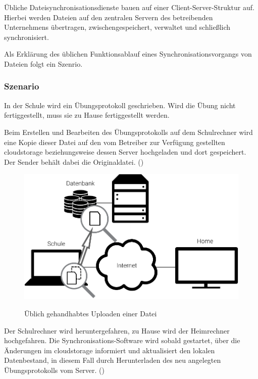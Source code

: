 Übliche Dateisynchronisationsdienste bauen auf einer Client-Server-Struktur auf.
Hierbei werden Dateien auf den zentralen Servern des betreibenden
Unternehmens übertragen, zwischengespeichert, verwaltet und schließlich
synchronisiert.

Als Erklärung des üblichen Funktionsablauf eines Synchronisationsvorgangs von
Dateien folgt ein Szenrio.

\subsubsection{Szenario}
In der Schule wird ein Übungsprotokoll geschrieben. Wird die Übung nicht
fertiggestellt, muss sie zu Hause fertiggestellt werden.

Beim Erstellen und Bearbeiten des Übungsprotokolls auf dem Schulrechner
wird eine Kopie dieser Datei auf den vom Betreiber zur Verfügung gestellten
\gls{cloudstorage} beziehungsweise dessen Server hochgeladen und dort gespeichert.
Der Sender behält dabei die Originaldatei. ()
\begin{figure}[htb]
	\centering
  \includegraphics[]{images/dropbox_upload}
	\label{dropbox_upload}
  \caption{Üblich gehandhabtes Uploaden einer Datei}
\end{figure}

Der Schulrechner wird heruntergefahren, zu Hause wird der Heimrechner hochgefahren. Die Synchronisations-Software wird
sobald gestartet, über die Änderungen im \gls{cloudstorage} informiert und aktualisiert den lokalen Datenbestand, in
diesem Fall durch Herunterladen des neu angelegten Übungsprotokolls vom Server. ()

